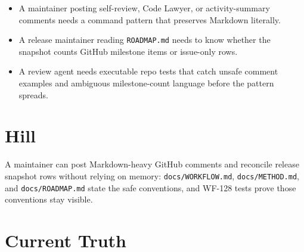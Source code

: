 \begin{itemize}
\tightlist
\item
  A maintainer posting self-review, Code Lawyer, or activity-summary comments needs a command pattern that preserves Markdown literally.
\item
  A release maintainer reading \texttt{R\allowbreak{}O\allowbreak{}A\allowbreak{}D\allowbreak{}M\allowbreak{}A\allowbreak{}P\allowbreak{}.\allowbreak{}m\allowbreak{}d} needs to know whether the snapshot counts GitHub milestone items or issue-only rows.
\item
  A review agent needs executable repo tests that catch unsafe comment examples and ambiguous milestone-count language before the pattern spreads.
\end{itemize}

\section{Hill}\label{record-210-hill}

A maintainer can post Markdown-heavy GitHub comments and reconcile release snapshot rows without relying on memory: \texttt{d\allowbreak{}o\allowbreak{}c\allowbreak{}s\allowbreak{}/\allowbreak{}W\allowbreak{}O\allowbreak{}R\allowbreak{}K\allowbreak{}F\allowbreak{}L\allowbreak{}O\allowbreak{}W\allowbreak{}.\allowbreak{}m\allowbreak{}d}, \texttt{d\allowbreak{}o\allowbreak{}c\allowbreak{}s\allowbreak{}/\allowbreak{}M\allowbreak{}E\allowbreak{}T\allowbreak{}H\allowbreak{}O\allowbreak{}D\allowbreak{}.\allowbreak{}m\allowbreak{}d}, and \texttt{d\allowbreak{}o\allowbreak{}c\allowbreak{}s\allowbreak{}/\allowbreak{}R\allowbreak{}O\allowbreak{}A\allowbreak{}D\allowbreak{}M\allowbreak{}A\allowbreak{}P\allowbreak{}.\allowbreak{}m\allowbreak{}d} state the safe conventions, and WF-128 tests prove those conventions stay visible.

\section{Current Truth}\label{record-210-current-truth}

